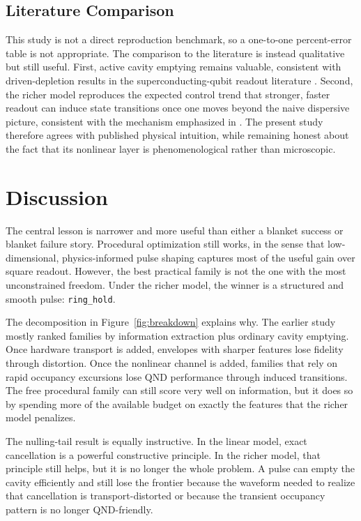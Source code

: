 \documentclass[11pt, a4paper]{article}
\begin{document}
\subsection{Literature Comparison}
This study is not a direct reproduction benchmark, so a one-to-one percent-error table is
not appropriate. The comparison to the literature is instead qualitative but still useful.
First, active cavity emptying remains valuable, consistent with driven-depletion results in
the superconducting-qubit readout literature \cite{mcclure2016rapid,walter2017rapid}.
Second, the richer model reproduces the expected control trend that stronger, faster
readout can induce state transitions once one moves beyond the naive dispersive picture,
consistent with the mechanism emphasized in \cite{sank2016measurement}. The present study
therefore agrees with published physical intuition, while remaining honest about the fact
that its nonlinear layer is phenomenological rather than microscopic.

\section{Discussion}
The central lesson is narrower and more useful than either a blanket success or blanket
failure story. Procedural optimization still works, in the sense that low-dimensional,
physics-informed pulse shaping captures most of the useful gain over square readout.
However, the best practical family is not the one with the most unconstrained freedom.
Under the richer model, the winner is a structured and smooth pulse: \texttt{ring\_hold}.

The decomposition in Figure~\ref{fig:breakdown} explains why. The earlier study mostly
ranked families by information extraction plus ordinary cavity emptying. Once hardware
transport is added, envelopes with sharper features lose fidelity through distortion. Once
the nonlinear channel is added, families that rely on rapid occupancy excursions lose QND
performance through induced transitions. The free procedural family can still score very
well on information, but it does so by spending more of the available budget on exactly the
features that the richer model penalizes.

The nulling-tail result is equally instructive. In the linear model, exact cancellation is
a powerful constructive principle. In the richer model, that principle still helps, but it
is no longer the whole problem. A pulse can empty the cavity efficiently and still lose the
frontier because the waveform needed to realize that cancellation is transport-distorted or
because the transient occupancy pattern is no longer QND-friendly.
\end{document}
